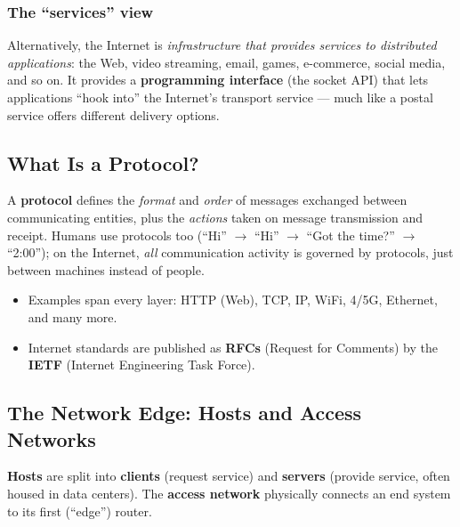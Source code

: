 \documentclass[hidelinks]{article}
\begin{document}
\subsubsection{The ``services'' view}
Alternatively, the Internet is \emph{infrastructure that provides services
to distributed applications}: the Web, video streaming, email, games,
e-commerce, social media, and so on. It provides a \textbf{programming
interface} (the socket API) that lets applications ``hook into'' the
Internet's transport service --- much like a postal service offers
different delivery options.

\subsection{What Is a Protocol?}

A \textbf{protocol} defines the \emph{format} and \emph{order} of messages
exchanged between communicating entities, plus the \emph{actions} taken on
message transmission and receipt. Humans use protocols too (``Hi'' $\to$
``Hi'' $\to$ ``Got the time?'' $\to$ ``2:00''); on the Internet,
\emph{all} communication activity is governed by protocols, just between
machines instead of people.

\begin{itemize}
    \item Examples span every layer: HTTP (Web), TCP, IP, WiFi, 4/5G,
    Ethernet, and many more.
    \item Internet standards are published as \textbf{RFCs} (Request for
    Comments) by the \textbf{IETF} (Internet Engineering Task Force).
\end{itemize}

\subsection{The Network Edge: Hosts and Access Networks}

\textbf{Hosts} are split into \textbf{clients} (request service) and
\textbf{servers} (provide service, often housed in data centers). The
\textbf{access network} physically connects an end system to its first
(``edge'') router.
\end{document}
